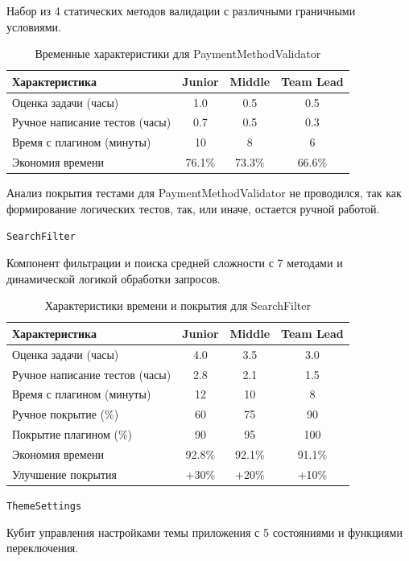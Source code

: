 \documentclass[14pt, russian]{scrartcl}
\begin{document}
Набор из 4 статических методов валидации с различными граничными условиями.

\begin{table}[h!]
\centering
\caption{Временные характеристики для PaymentMethodValidator}
\begin{tabular}{|l|c|c|c|}
\hline
Характеристика & Junior & Middle & Team Lead \\
\hline
Оценка задачи (часы) & 1.0 & 0.5 & 0.5 \\
Ручное написание тестов (часы) & 0.7 & 0.5 & 0.3 \\
Время с плагином (минуты) & 10 & 8 & 6 \\
Экономия времени & 76.1\% & 73.3\% & 66.6\% \\
\hline
\end{tabular}
\vspace{1ex}
\end{table}

Анализ покрытия тестами для PaymentMethodValidator не проводился, так как формирование логических тестов, так, или иначе, остается ручной работой.

\texttt{SearchFilter}

Компонент фильтрации и поиска средней сложности с 7 методами и динамической логикой обработки запросов.

\begin{table}[h!]
\centering
\caption{Характеристики времени и покрытия для SearchFilter}
\begin{tabular}{|l|c|c|c|}
\hline
Характеристика & Junior & Middle & Team Lead \\
\hline
Оценка задачи (часы) & 4.0 & 3.5 & 3.0 \\
Ручное написание тестов (часы) & 2.8 & 2.1 & 1.5 \\
Время с плагином (минуты) & 12 & 10 & 8 \\
Ручное покрытие (\%) & 60 & 75 & 90 \\
Покрытие плагином (\%) & 90 & 95 & 100 \\
Экономия времени & 92.8\% & 92.1\% & 91.1\% \\
Улучшение покрытия & +30\% & +20\% & +10\% \\
\hline
\end{tabular}
\vspace{1ex}
\end{table}

\texttt{ThemeSettings}

Кубит управления настройками темы приложения с 5 состояниями и функциями переключения.
\end{document}
